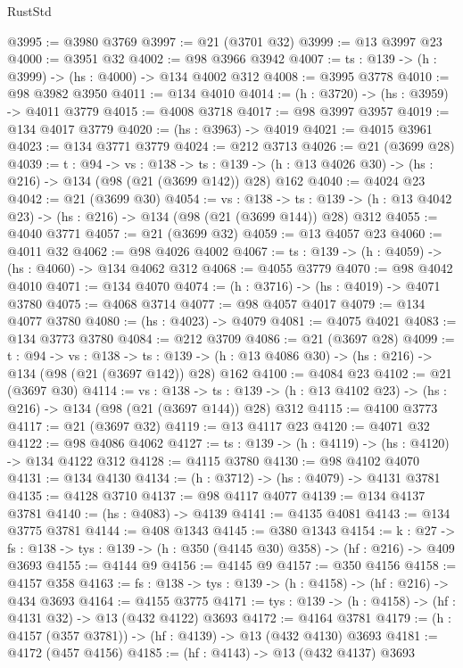 \begin{lexlean}{RustStd}
\begin{coremodule}
{\begin{coremodule}
{{{{{{{{{{@3995 := @3980 @3769
@3997 := @21 (@3701 @32)
@3999 := @13 @3997 @23
@4000 := @3951 @32
@4002 := @98 @3966 @3942
@4007 := {ts : @139} -> (h : @3999) -> (hs : @4000) -> @134 @4002 @312
@4008 := @3995 @3778
@4010 := @98 @3982 @3950
@4011 := @134 @4010
@4014 := (h : @3720) -> (hs : @3959) -> @4011 @3779
@4015 := @4008 @3718
@4017 := @98 @3997 @3957
@4019 := @134 @4017 @3779
@4020 := (hs : @3963) -> @4019
@4021 := @4015 @3961
@4023 := @134 @3771 @3779
@4024 := @212 @3713
@4026 := @21 (@3699 @28)
@4039 := {t : @94} ->
  {vs : @138} ->
  {ts : @139} -> (h : @13 @4026 @30) -> (hs : @216) -> @134 (@98 (@21 (@3699 @142)) @28) @162
@4040 := @4024 @23
@4042 := @21 (@3699 @30)
@4054 := {vs : @138} ->
  {ts : @139} -> (h : @13 @4042 @23) -> (hs : @216) -> @134 (@98 (@21 (@3699 @144)) @28) @312
@4055 := @4040 @3771
@4057 := @21 (@3699 @32)
@4059 := @13 @4057 @23
@4060 := @4011 @32
@4062 := @98 @4026 @4002
@4067 := {ts : @139} -> (h : @4059) -> (hs : @4060) -> @134 @4062 @312
@4068 := @4055 @3779
@4070 := @98 @4042 @4010
@4071 := @134 @4070
@4074 := (h : @3716) -> (hs : @4019) -> @4071 @3780
@4075 := @4068 @3714
@4077 := @98 @4057 @4017
@4079 := @134 @4077 @3780
@4080 := (hs : @4023) -> @4079
@4081 := @4075 @4021
@4083 := @134 @3773 @3780
@4084 := @212 @3709
@4086 := @21 (@3697 @28)
@4099 := {t : @94} ->
  {vs : @138} ->
  {ts : @139} -> (h : @13 @4086 @30) -> (hs : @216) -> @134 (@98 (@21 (@3697 @142)) @28) @162
@4100 := @4084 @23
@4102 := @21 (@3697 @30)
@4114 := {vs : @138} ->
  {ts : @139} -> (h : @13 @4102 @23) -> (hs : @216) -> @134 (@98 (@21 (@3697 @144)) @28) @312
@4115 := @4100 @3773
@4117 := @21 (@3697 @32)
@4119 := @13 @4117 @23
@4120 := @4071 @32
@4122 := @98 @4086 @4062
@4127 := {ts : @139} -> (h : @4119) -> (hs : @4120) -> @134 @4122 @312
@4128 := @4115 @3780
@4130 := @98 @4102 @4070
@4131 := @134 @4130
@4134 := (h : @3712) -> (hs : @4079) -> @4131 @3781
@4135 := @4128 @3710
@4137 := @98 @4117 @4077
@4139 := @134 @4137 @3781
@4140 := (hs : @4083) -> @4139
@4141 := @4135 @4081
@4143 := @134 @3775 @3781
@4144 := @408 @1343
@4145 := @380 @1343
@4154 := {k : @27} ->
  {fs : @138} -> {tys : @139} -> (h : @350 (@4145 @30) @358) -> (hf : @216) -> @409 @3693
@4155 := @4144 @9
@4156 := @4145 @9
@4157 := @350 @4156
@4158 := @4157 @358
@4163 := {fs : @138} -> {tys : @139} -> (h : @4158) -> (hf : @216) -> @434 @3693
@4164 := @4155 @3775
@4171 := {tys : @139} -> (h : @4158) -> (hf : @4131 @32) -> @13 (@432 @4122) @3693
@4172 := @4164 @3781
@4179 := (h : @4157 (@357 @3781)) -> (hf : @4139) -> @13 (@432 @4130) @3693
@4181 := @4172 (@457 @4156)
@4185 := (hf : @4143) -> @13 (@432 @4137) @3693
}}}}}}}}}}
\end{coremodule}}
\end{coremodule}
\end{lexlean}
